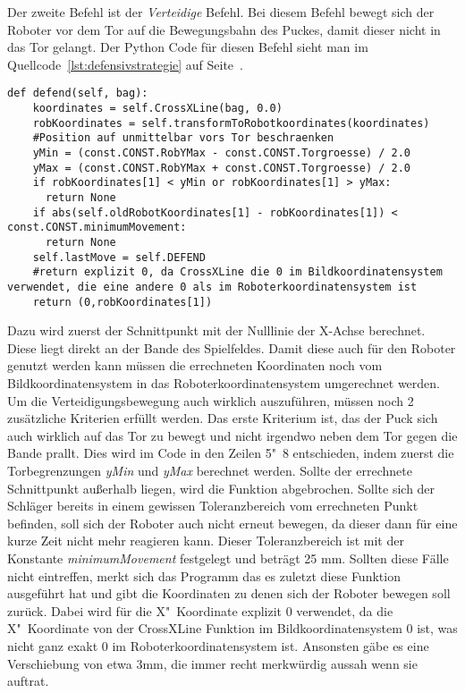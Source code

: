 Der zweite Befehl ist der \textit{Verteidige} Befehl. Bei diesem Befehl bewegt sich der Roboter vor dem Tor auf die Bewegungsbahn des Puckes, damit dieser nicht in das Tor gelangt. Der Python Code für diesen Befehl sieht man im Quellcode~\ref{lst:defensivstrategie} auf Seite~\pageref{lst:defensivstrategie}.
\begin{lstlisting}[caption= python-funktion für Defensivstrategie, label=lst:defensivstrategie]
def defend(self, bag):
	koordinates = self.CrossXLine(bag, 0.0)
	robKoordinates = self.transformToRobotkoordinates(koordinates)
	#Position auf unmittelbar vors Tor beschraenken
	yMin = (const.CONST.RobYMax - const.CONST.Torgroesse) / 2.0
	yMax = (const.CONST.RobYMax + const.CONST.Torgroesse) / 2.0
	if robKoordinates[1] < yMin or robKoordinates[1] > yMax:
	  return None
	if abs(self.oldRobotKoordinates[1] - robKoordinates[1]) < const.CONST.minimumMovement:
	  return None
	self.lastMove = self.DEFEND
	#return explizit 0, da CrossXLine die 0 im Bildkoordinatensystem verwendet, die eine andere 0 als im Roboterkoordinatensystem ist
	return (0,robKoordinates[1])
\end{lstlisting}
Dazu wird zuerst der Schnittpunkt mit der Nulllinie der X-Achse berechnet. Diese liegt direkt an der Bande des Spielfeldes. Damit diese auch für den Roboter genutzt werden kann müssen die errechneten Koordinaten noch vom Bildkoordinatensystem in das Roboterkoordinatensystem umgerechnet werden. Um die Verteidigungsbewegung auch wirklich auszuführen, müssen noch 2 zusätzliche Kriterien erfüllt werden. Das erste Kriterium ist, das der Puck sich auch wirklich auf das Tor zu bewegt und nicht irgendwo neben dem Tor gegen die Bande prallt. Dies wird im Code in den Zeilen 5"~8 entschieden, indem zuerst die Torbegrenzungen  \textit{yMin} und \textit{yMax} berechnet werden. Sollte der errechnete Schnittpunkt außerhalb liegen, wird die Funktion abgebrochen. Sollte sich der Schläger bereits in einem gewissen Toleranzbereich vom errechneten Punkt befinden, soll sich der Roboter auch nicht erneut bewegen, da dieser dann für eine kurze Zeit nicht mehr reagieren kann. Dieser Toleranzbereich ist mit der Konstante \textit{minimumMovement} festgelegt und beträgt 25 mm. Sollten diese Fälle nicht eintreffen, merkt sich das Programm das es zuletzt diese Funktion ausgeführt hat und gibt die Koordinaten zu denen sich der Roboter bewegen soll zurück. Dabei wird für die X"~Koordinate explizit 0 verwendet, da die X"~Koordinate von der CrossXLine Funktion im Bildkoordinatensystem 0 ist, was nicht ganz exakt 0 im Roboterkoordinatensystem ist. Ansonsten gäbe es eine Verschiebung von etwa 3mm, die immer recht merkwürdig aussah wenn sie auftrat.


